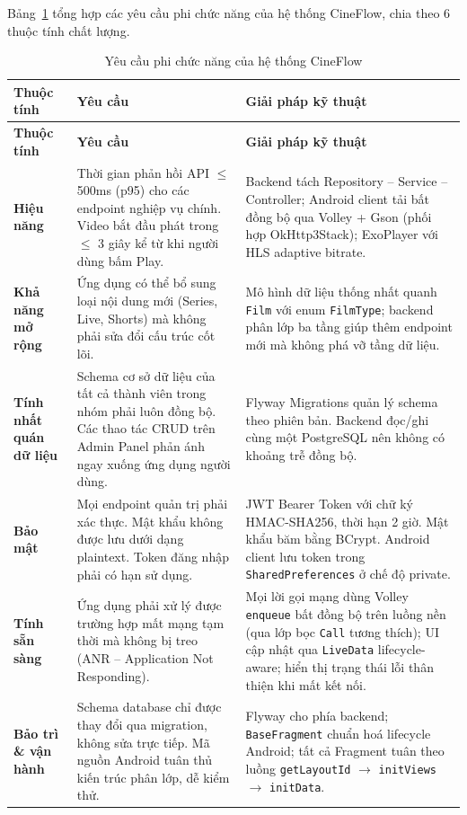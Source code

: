 Bảng~\ref{tab:nfr} tổng hợp các yêu cầu phi chức năng của hệ thống CineFlow, chia
theo 6 thuộc tính chất lượng.

\begingroup
\renewcommand{\arraystretch}{1.4}
\begin{longtable}{|p{3.2cm}|p{5.8cm}|p{5.8cm}|}
  \caption{Yêu cầu phi chức năng của hệ thống CineFlow} \label{tab:nfr} \\
  \hline
  \textbf{Thuộc tính}      & \textbf{Yêu cầu} & \textbf{Giải pháp kỹ thuật} \\
  \hline
  \endfirsthead

  \hline
  \textbf{Thuộc tính}      & \textbf{Yêu cầu} & \textbf{Giải pháp kỹ thuật} \\
  \hline
  \endhead

  \hline
  \endfoot

  \textbf{Hiệu năng}       &
  Thời gian phản hồi API $\leq$ 500ms (p95) cho các endpoint nghiệp vụ chính. Video
  bắt đầu phát trong $\leq$ 3 giây kể từ khi người dùng bấm Play. &
  Backend tách Repository -- Service -- Controller; Android client tải bất đồng bộ
  qua Volley + Gson (phối hợp OkHttp3Stack); ExoPlayer với HLS adaptive bitrate. \\
  \hline
  \textbf{Khả năng mở rộng} &
  Ứng dụng có thể bổ sung loại nội dung mới (Series, Live, Shorts) mà không phải
  sửa đổi cấu trúc cốt lõi. &
  Mô hình dữ liệu thống nhất quanh \texttt{Film} với enum \texttt{FilmType}; backend
  phân lớp ba tầng giúp thêm endpoint mới mà không phá vỡ tầng dữ liệu. \\
  \hline
  \textbf{Tính nhất quán dữ liệu} &
  Schema cơ sở dữ liệu của tất cả thành viên trong nhóm phải luôn đồng bộ. Các thao
  tác CRUD trên Admin Panel phản ánh ngay xuống ứng dụng người dùng. &
  Flyway Migrations quản lý schema theo phiên bản. Backend đọc/ghi cùng một
  PostgreSQL nên không có khoảng trễ đồng bộ. \\
  \hline
  \textbf{Bảo mật} &
  Mọi endpoint quản trị phải xác thực. Mật khẩu không được lưu dưới dạng plaintext.
  Token đăng nhập phải có hạn sử dụng. &
  JWT Bearer Token với chữ ký HMAC-SHA256, thời hạn 2 giờ. Mật khẩu băm bằng BCrypt.
  Android client lưu token trong \texttt{SharedPreferences} ở chế độ private. \\
  \hline
  \textbf{Tính sẵn sàng} &
  Ứng dụng phải xử lý được trường hợp mất mạng tạm thời mà không bị treo (ANR --
  Application Not Responding). &
  Mọi lời gọi mạng dùng Volley \texttt{enqueue} bất đồng bộ trên luồng nền (qua lớp bọc \texttt{Call} tương thích); UI
  cập nhật qua \texttt{LiveData} lifecycle-aware; hiển thị trạng thái lỗi thân thiện
  khi mất kết nối. \\
  \hline
  \textbf{Bảo trì \& vận hành} &
  Schema database chỉ được thay đổi qua migration, không sửa trực tiếp. Mã nguồn
  Android tuân thủ kiến trúc phân lớp, dễ kiểm thử. &
  Flyway cho phía backend; \texttt{BaseFragment} chuẩn hoá lifecycle Android; tất
  cả Fragment tuân theo luồng \texttt{getLayoutId} $\rightarrow$ \texttt{initViews}
  $\rightarrow$ \texttt{initData}. \\
  \hline
\end{longtable}
\endgroup


